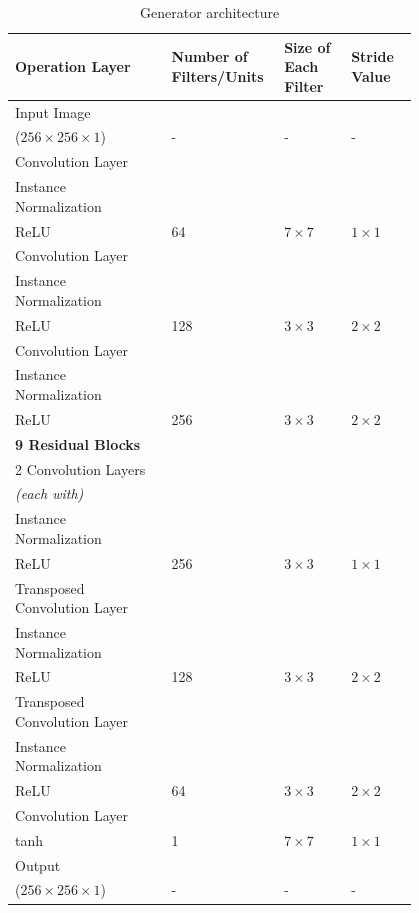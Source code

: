\begin{table}[H]
    \centering
    \begin{tabular}{P{0.35\linewidth} P{0.15\linewidth} P{0.15\linewidth} P{0.15\linewidth}} 
        \toprule
        \textbf{Operation Layer} & \textbf{Number of Filters/Units} & \textbf{Size of Each Filter} & \textbf{Stride Value}\\
        \toprule
        \toprule
        Input Image \\($256 \times 256 \times 1$) & - & - & - \\
        \midrule
        Convolution Layer\\Instance Normalization\\\ac{ReLU} & 64 & $7 \times 7$ & $1 \times 1$\\
        \midrule
        Convolution Layer\\Instance Normalization\\\ac{ReLU} & 128 & $3 \times 3$ & $2 \times 2$\\
        \midrule
        Convolution Layer\\Instance Normalization\\\ac{ReLU} & 256 & $3 \times 3$ & $2 \times 2$\\
        \midrule
        \textbf{9 Residual Blocks}\\
	  2 Convolution Layers\\ \textit{(each with)}\\Instance Normalization\\\ac{ReLU} & 256 & $3 \times 3$ & $1 \times 1$\\
        \midrule
        Transposed Convolution Layer\\Instance Normalization\\\ac{ReLU} & 128 & $3 \times 3$ & $2 \times 2$\\
        \midrule
        Transposed Convolution Layer\\Instance Normalization\\\ac{ReLU} & 64 & $3 \times 3$ & $2 \times 2$\\
        \midrule
         Convolution Layer\\tanh & 1 & $7 \times 7$ & $1 \times 1$\\
        \midrule
        \midrule
        Output  \\($256 \times 256 \times 1$) & - & - & -\\
        \bottomrule
    \end{tabular}
    \caption[Generator architecture]{Generator architecture}
    \label{table:GeneratorArchitecture}
\end{table}




